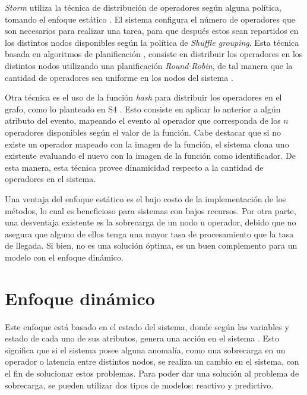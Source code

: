 \textsl{Storm} utiliza la técnica de distribución de operadores según alguna política, tomando el enfoque estático \citep{stormtwitter}. El sistema configura el número de operadores que son necesarios para realizar una tarea, para que después estos sean repartidos en los distintos nodos disponibles según la política de \textit{Shuffle grouping}. Esta técnica basada en algoritmos de planificación \citep{bookScheduling}, consiste en distribuir los operadores en los distintos nodos utilizando una planificación \textsl{Round-Robin}, de tal manera que la cantidad de operadores sea uniforme en los nodos del sistema \citep{bookstorm}.

Otra técnica es el uso de la función \textsl{hash} \citep{RogawayS04} para distribuir los operadores en el grafo, como lo planteado en S4 \citep{s4yahoo}. Esto consiste en aplicar lo anterior a algún atributo del evento, mapeando el evento al operador que corresponda de los $n$ operadores disponibles según el valor de la función. Cabe destacar que si no existe un operador mapeado con la imagen de la función, el sistema clona uno existente evaluando el nuevo con la imagen de la función como identificador. De esta manera, esta técnica provee dinamicidad respecto a la cantidad de operadores en el sistema.

Una ventaja del enfoque estático es el bajo costo de la implementación de los métodos, lo cual es beneficioso para sistemas con bajos recursos. Por otra parte, una desventaja existente es la sobrecarga de un nodo u operador, debido que no asegura que alguno de ellos tenga una mayor tasa de procesamiento que la tasa de llegada. Si bien, no es una solución óptima, es un buen complemento para un modelo con el enfoque dinámico.

\section{Enfoque dinámico}

Este enfoque está basado en el estado del sistema, donde según las variables y estado de cada uno de sus atributos, genera una acción en el sistema \citep{CasavantK88}. Esto significa que si el sistema posee alguna anomalía, como una sobrecarga en un operador o latencia entre distintos nodos, se realiza un cambio en el sistema, con el fin de solucionar estos problemas. Para poder dar una solución al problema de sobrecarga, se pueden utilizar dos tipos de modelos: reactivo y predictivo.

